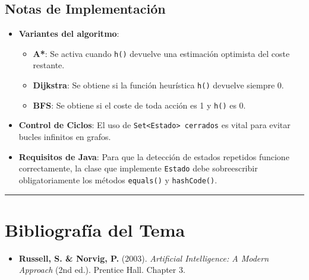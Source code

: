 \subsection{Notas de Implementación}
\begin{itemize}
    \item \textbf{Variantes del algoritmo}:
    \begin{itemize}
        \item \textbf{A*}: Se activa cuando \texttt{h()} devuelve una estimación optimista del coste restante.
        \item \textbf{Dijkstra}: Se obtiene si la función heurística \texttt{h()} devuelve siempre 0.
        \item \textbf{BFS}: Se obtiene si el coste de toda acción es 1 y \texttt{h()} es 0.
    \end{itemize}
    \item \textbf{Control de Ciclos}: El uso de \texttt{Set<Estado> cerrados} es vital para evitar bucles infinitos en grafos.
    \item \textbf{Requisitos de Java}: Para que la detección de estados repetidos funcione correctamente, la clase que implemente \texttt{Estado} debe sobreescribir obligatoriamente los métodos \texttt{equals()} y \texttt{hashCode()}.
\end{itemize}

\bigskip
\noindent\rule{\textwidth}{0.4pt} 

\section*{Bibliografía del Tema}

\begin{itemize}
    \item \textbf{Russell, S. \& Norvig, P.} (2003). \textit{Artificial Intelligence: A Modern Approach} (2nd ed.). Prentice Hall. Chapter 3.
    
\end{itemize}
\newpage